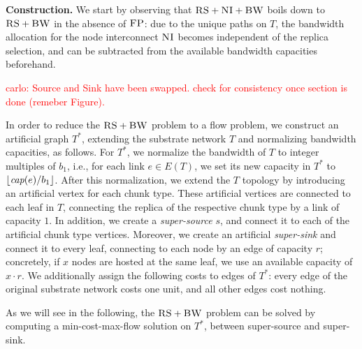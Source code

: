 \documentclass[9pt,twocolumn]{scrartcl}
\newcommand{\carlo}[1]{\textcolor{red}{carlo: #1}}
\newcommand{\MaFactor}{r}
\newcommand{\Source}{\ensuremath{s}}
\newcommand{\capacity}{\emph{cap}}
\newcommand{\CC}{\textsc{NI}}
\newcommand{\FP}{\textsc{FP}}
\newcommand{\RS}{\textsc{RS}}
\newcommand{\BW}{\textsc{BW}}
\newcommand{\Tree}{\ensuremath{T}}
\newcommand{\CostTrans}{\ensuremath{b_1}}
\begin{document}

\textbf{Construction.}
We start by observing that $\RS+\CC+\BW$ boils down to
$\RS+\BW$ in the absence of $\FP$: due to the unique paths
on $\Tree$, the bandwidth allocation for the node interconnect
$\CC$ becomes independent of the replica selection, and can be subtracted
from the available bandwidth capacities beforehand.

\carlo{Source and Sink have been swapped. check for consistency once section is
done (remeber Figure).}

In order to reduce the $\RS+\BW$ problem to a flow problem, we construct
an artificial graph $\Tree^*$, extending the substrate network $\Tree$ and
normalizing bandwidth capacities, as follows. For $\Tree^*$,
we normalize the bandwidth of $\Tree$ to integer multiples of $\CostTrans$,
i.e., for each link $e\in E(\Tree)$, we set its new
capacity in $\Tree^*$ to $\lfloor\capacity(e)/\CostTrans\rfloor$. 
After this normalization, we extend the $\Tree$ topology by
introducing an artificial vertex for each chunk type. These artificial
vertices are connected to each leaf in $\Tree$,
connecting the replica of the respective chunk type by a link of capacity $1$. In
addition, we create a
\emph{super-source} $\Source$, and connect it to each of the artificial chunk
type vertices. Moreover, we create an artificial \emph{super-sink} and
connect it to every leaf, connecting to each node by an edge of capacity $\MaFactor$; 
concretely, if $x$ nodes are hosted at the same leaf, we use an available capacity of 
$x \cdot \MaFactor$.
We additionally assign the following costs to edges of $\Tree^*$:
every edge of the original substrate network costs one unit, and all other edges
cost nothing.

As we will see in the following, the $\RS+\BW$ problem can be solved by computing
a min-cost-max-flow solution on $\Tree^*$, between super-source and super-sink. 
\end{document}
